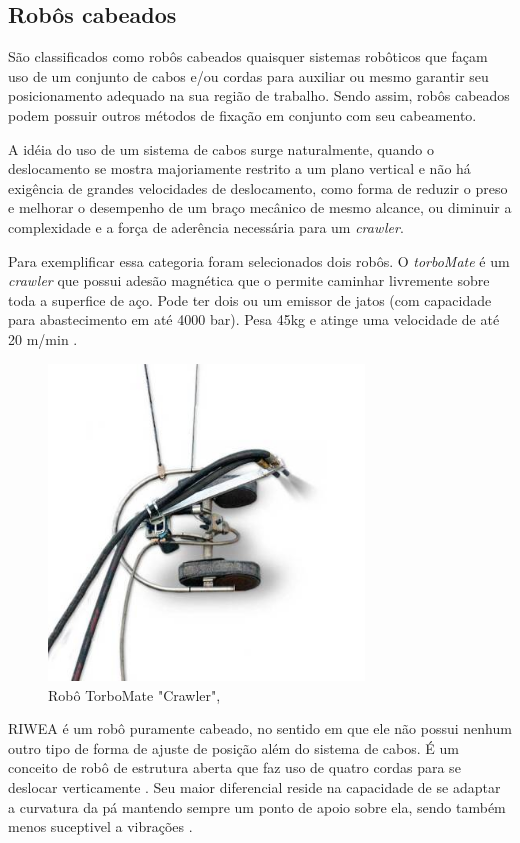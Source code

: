 \subsection{Robôs cabeados}
São classificados como robôs cabeados quaisquer sistemas robôticos que façam
uso de um conjunto de cabos e/ou cordas para auxiliar ou mesmo garantir seu
posicionamento adequado na sua região de trabalho. Sendo assim, robôs cabeados
podem possuir outros métodos de fixação em conjunto com seu cabeamento.

A idéia do uso de um sistema de cabos surge naturalmente, quando o deslocamento
se mostra majoriamente restrito a um plano vertical e não há exigência de
grandes velocidades de deslocamento, como forma de reduzir o preso e melhorar o
desempenho de um braço mecânico de mesmo alcance, ou diminuir a complexidade e
a força de aderência necessária para um \textit{crawler}.

Para exemplificar essa categoria foram selecionados dois robôs. O
\textit{torboMate} é um \textit{crawler} que possui adesão magnética que o
permite caminhar livremente sobre toda a superfice de aço. Pode ter dois ou um
emissor de jatos (com capacidade para abastecimento em até 4000 bar). Pesa 45kg
e atinge uma velocidade de até 20 m/min \citep{torbo}.

\begin{figure}[ht]
	\centering
	\includegraphics[width=8.4cm]{figs/cables/torbo}
	\caption{Robô TorboMate "Crawler", \cite{torbo}}
	\label{fig:cables:torbo}
\end{figure}

RIWEA é um robô puramente cabeado, no sentido em que ele não possui nenhum
outro tipo de forma de ajuste de posição além do sistema de cabos. É um
conceito de robô de estrutura aberta que faz uso de quatro cordas para se
deslocar verticamente \citep{jeon2012maintenance}. Seu maior diferencial reside
na capacidade de se adaptar a curvatura da pá mantendo sempre um ponto de apoio
sobre ela, sendo também menos suceptivel a vibrações \citep{riwea}.

